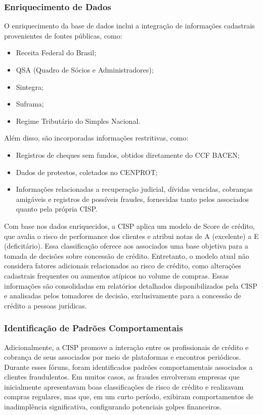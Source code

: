 \documentclass[12pt,a4paper]{article}
\begin{document}
\subsubsection{Enriquecimento de Dados}

O enriquecimento da base de dados inclui a integração de informações cadastrais provenientes de fontes públicas, como:
\begin{itemize}
    \item Receita Federal do Brasil;
    \item QSA (Quadro de Sócios e Administradores);
    \item Sintegra;
    \item Suframa;
    \item Regime Tributário do Simples Nacional.
\end{itemize}

Além disso, são incorporadas informações restritivas, como:
\begin{itemize}
    \item Registros de cheques sem fundos, obtidos diretamente do CCF BACEN;
    \item Dados de protestos, coletados no CENPROT;
    \item Informações relacionadas a recuperação judicial, dívidas vencidas, cobranças amigáveis e registros de possíveis fraudes, fornecidas tanto pelos associados quanto pela própria CISP.
\end{itemize}

Com base nos dados enriquecidos, a CISP aplica um modelo de Score de crédito, que avalia o risco de performance dos clientes e atribui notas de A (excelente) a E (deficitário). Essa classificação oferece aos associados uma base objetiva para a tomada de decisões sobre concessão de crédito. Entretanto, o modelo atual não considera fatores adicionais relacionados ao risco de crédito, como alterações cadastrais frequentes ou aumentos atípicos no volume de compras. Essas informações são consolidadas em relatórios detalhados disponibilizados pela CISP e analisadas pelos tomadores de decisão, exclusivamente para a concessão de crédito a pessoas jurídicas.

\subsubsection{Identificação de Padrões Comportamentais}

Adicionalmente, a CISP promove a interação entre os profissionais de crédito e cobrança de seus associados por meio de plataformas e encontros periódicos. Durante esses fóruns, foram identificados padrões comportamentais associados a clientes fraudulentos. Em muitos casos, as fraudes envolveram empresas que inicialmente apresentavam boas classificações de risco de crédito e realizavam compras regulares, mas que, em um curto período, exibiram comportamentos de inadimplência significativa, configurando potenciais golpes financeiros.
\end{document}
